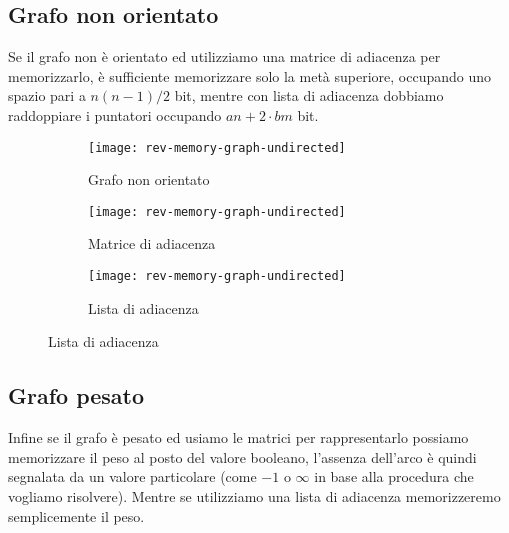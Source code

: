 \vspace{-20pt}
\subsection*{Grafo non orientato}
\vspace{-5pt}

Se il grafo non è orientato ed utilizziamo una matrice di adiacenza per memorizzarlo, è sufficiente memorizzare solo la metà superiore, occupando uno spazio pari a \(n(n-1)/2\) bit, mentre con lista di adiacenza dobbiamo raddoppiare i puntatori occupando \(an + 2 \cdot bm\) bit.

\begin{figure}[H]\hfill
	\begin{subfigure}[t]{.25\textwidth}\centering
		\texttt{[image: rev-memory-graph-undirected]}
		\caption{Grafo non orientato}
	\end{subfigure}\hfill
	\begin{subfigure}[t]{.25\textwidth}\centering
		\texttt{[image: rev-memory-graph-undirected]}
		\caption{Matrice di adiacenza}
	\end{subfigure}\hfill
	\begin{subfigure}[t]{.35\textwidth}\raggedright
		\texttt{[image: rev-memory-graph-undirected]}
		\caption{Lista di adiacenza}
	\end{subfigure}
\end{figure}

\vspace{-20pt}
\subsection*{Grafo pesato}
\vspace{-5pt}

Infine se il grafo è pesato ed usiamo le matrici per rappresentarlo possiamo memorizzare il peso al posto del valore booleano, l'assenza dell'arco è quindi segnalata da un valore particolare (come \(-1\) o \(\infty\) in base alla procedura che vogliamo risolvere).
Mentre se utilizziamo una lista di adiacenza memorizzeremo semplicemente il peso.

